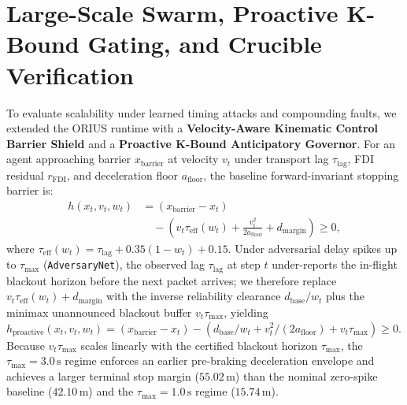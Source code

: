 \documentclass[conference]{IEEEtran}
\begin{document}
\section{Large-Scale Swarm, Proactive K-Bound Gating, and Crucible Verification}
To evaluate scalability under learned timing attacks and compounding faults, we extended the ORIUS runtime with a \textbf{Velocity-Aware Kinematic Control Barrier Shield} and a \textbf{Proactive K-Bound Anticipatory Governor}. For an agent approaching barrier $x_{\mathrm{barrier}}$ at velocity $v_t$ under transport lag $\tau_{\mathrm{lag}}$, FDI residual $r_{\mathrm{FDI}}$, and deceleration floor $a_{\mathrm{floor}}$, the baseline forward-invariant stopping barrier is:
\begin{equation}
\begin{aligned}
h(x_t, v_t, w_t) &= (x_{\mathrm{barrier}} - x_t) \\
&\quad - \left(v_t \tau_{\mathrm{eff}}(w_t) + \frac{v_t^2}{2 a_{\mathrm{floor}}} + d_{\mathrm{margin}}\right) \ge 0,
\end{aligned}
\end{equation}
where $\tau_{\mathrm{eff}}(w_t) = \tau_{\mathrm{lag}} + 0.35(1-w_t) + 0.15$. Under adversarial delay spikes up to $\tau_{\max}$ (\texttt{AdversaryNet}), the observed lag $\tau_{\mathrm{lag}}$ at step $t$ under-reports the in-flight blackout horizon before the next packet arrives; we therefore replace $v_t \tau_{\mathrm{eff}}(w_t) + d_{\mathrm{margin}}$ with the inverse reliability clearance $d_{\mathrm{base}}/w_t$ plus the minimax unannounced blackout buffer $v_t \tau_{\max}$, yielding $h_{\mathrm{proactive}}(x_t,v_t,w_t) = (x_{\mathrm{barrier}}-x_t) - (d_{\mathrm{base}}/w_t + v_t^2/(2a_{\mathrm{floor}}) + v_t\tau_{\max}) \ge 0$. Because $v_t \tau_{\max}$ scales linearly with the certified blackout horizon $\tau_{\max}$, the $\tau_{\max}=3.0\,\text{s}$ regime enforces an earlier pre-braking deceleration envelope and achieves a larger terminal stop margin ($55.02\,\text{m}$) than the nominal zero-spike baseline ($42.10\,\text{m}$) and the $\tau_{\max}=1.0\,\text{s}$ regime ($15.74\,\text{m}$).
\end{document}
